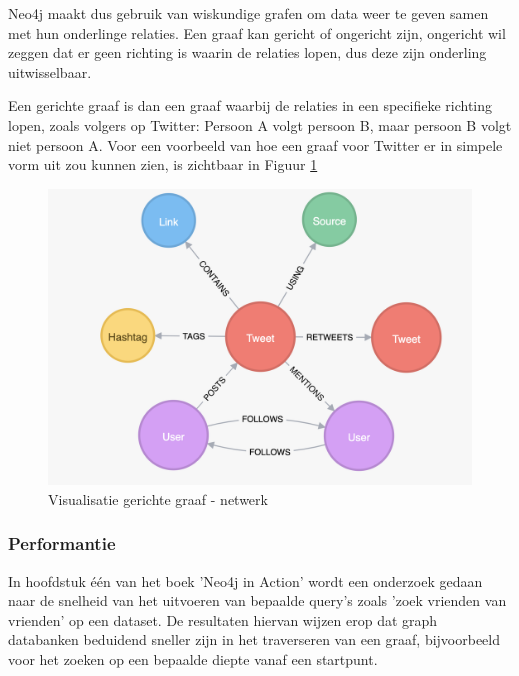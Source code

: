 Neo4j maakt dus gebruik van wiskundige grafen om data weer te geven samen met hun onderlinge relaties. Een graaf kan gericht of ongericht zijn, ongericht wil zeggen dat er geen richting is waarin de relaties lopen, dus deze zijn onderling uitwisselbaar. 

Een gerichte graaf is dan een graaf waarbij de relaties in een specifieke richting lopen, zoals volgers op Twitter: Persoon A volgt persoon B, maar persoon B volgt niet persoon A. Voor een voorbeeld van hoe een graaf voor Twitter er in simpele vorm uit zou kunnen zien, is zichtbaar in Figuur \ref{fig:TwitterGraphExample}

\begin{figure} [hbt!]
	\centering
	\includegraphics[width=\linewidth]{img/twitter_graph}
	\caption[Visualisatie gerichte graaf - netwerk]{Visualisatie gerichte graaf - netwerk}
	\label{fig:TwitterGraphExample}
\end{figure}

\newpage
\subsubsection{Performantie}
\label{subsubsec:Performantie}

In hoofdstuk één van het boek 'Neo4j in Action' \autocite{Vukotic2014} wordt een onderzoek gedaan naar de snelheid van het uitvoeren van bepaalde query's zoals 'zoek vrienden van vrienden' op een dataset. De resultaten hiervan wijzen erop dat graph databanken beduidend sneller zijn in het traverseren van een graaf, bijvoorbeeld voor het zoeken op een bepaalde diepte vanaf een startpunt.

